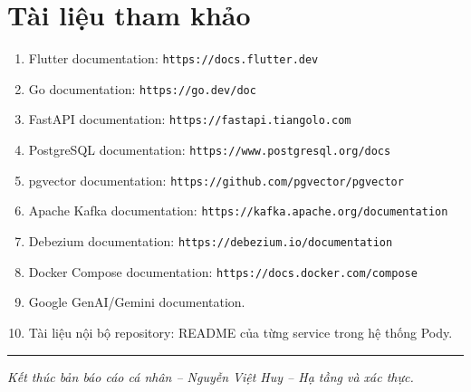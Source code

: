 \documentclass[14pt,a4paper,oneside]{extreport}
\begin{document}
\section{Tài liệu tham khảo}
\label{sec:tai-lieu-tham-khao}

\begin{enumerate}[leftmargin=2cm]
  \item Flutter documentation: \texttt{https://docs.flutter.dev}
  \item Go documentation: \texttt{https://go.dev/doc}
  \item FastAPI documentation: \texttt{https://fastapi.tiangolo.com}
  \item PostgreSQL documentation: \texttt{https://www.postgresql.org/docs}
  \item pgvector documentation: \texttt{https://github.com/pgvector/pgvector}
  \item Apache Kafka documentation: \texttt{https://kafka.apache.org/documentation}
  \item Debezium documentation: \texttt{https://debezium.io/documentation}
  \item Docker Compose documentation: \texttt{https://docs.docker.com/compose}
  \item Google GenAI/Gemini documentation.
  \item Tài liệu nội bộ repository: README của từng service trong hệ thống Pody.
\end{enumerate}

\vspace{1cm}
\noindent\rule{\textwidth}{0.4pt}

\noindent
\textit{Kết thúc bản báo cáo cá nhân -- Nguyễn Việt Huy -- Hạ tầng và xác thực.}
\end{document}
